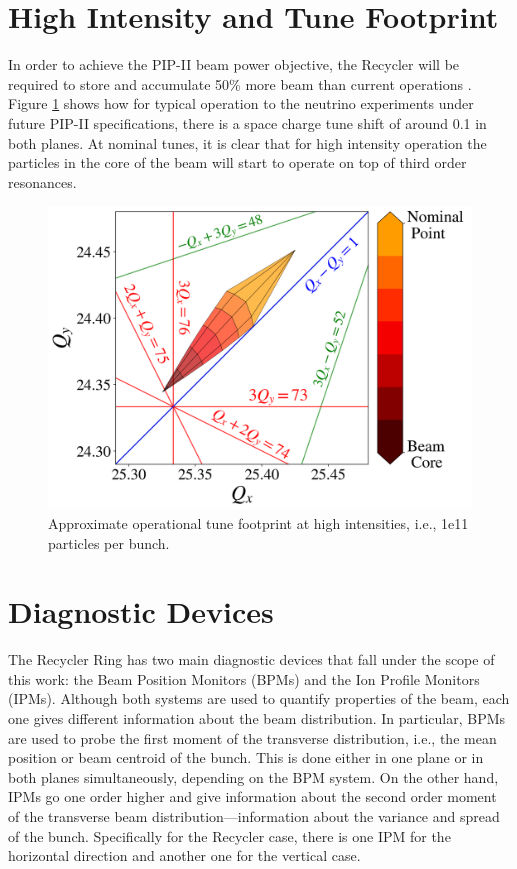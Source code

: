 \section{High Intensity and Tune Footprint}

In order to achieve the PIP-II beam power objective, the Recycler will be required to store and accumulate 50\% more beam than current operations \cite{pipII1}. Figure \ref{fig:rrtdhigh} shows how for typical operation to the neutrino experiments under future PIP-II specifications, there is a space charge tune shift of around 0.1 in both planes. At nominal tunes, it is clear that for high intensity operation the particles in the core of the beam will start to operate on top of third order resonances.

\begin{figure}[H]
   \centering
   \includegraphics[width=\columnwidth]{chapter3/rrtdhigh.png}
   \caption{Approximate operational tune footprint at high intensities, i.e., 1e11 particles per bunch.}
   \label{fig:rrtdhigh}
\end{figure}

\section{Diagnostic Devices}

The Recycler Ring has two main diagnostic devices that fall under the scope of this work: the Beam Position Monitors (BPMs) and the Ion Profile Monitors (IPMs). Although both systems are used to quantify properties of the beam, each one gives different information about the beam distribution. In particular, BPMs are used to probe the first moment of the transverse distribution, i.e., the mean position or beam centroid of the bunch. This is done either in one plane or in both planes simultaneously, depending on the BPM system. On the other hand, IPMs go one order higher and give information about the second order moment of the transverse beam distribution---information about the variance and spread of the bunch. Specifically for the Recycler case, there is one IPM for the horizontal direction and another one for the vertical case.

